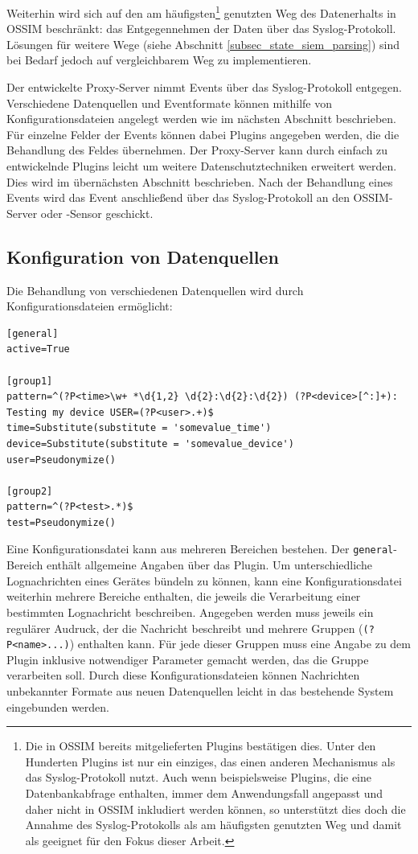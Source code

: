 Weiterhin wird sich auf den am häufigsten\footnote{
  Die in OSSIM bereits mitgelieferten Plugins bestätigen dies. Unter den Hunderten Plugins ist nur ein einziges, das einen anderen Mechanismus als das Syslog-Protokoll nutzt. Auch wenn beispielsweise Plugins, die eine Datenbankabfrage enthalten, immer dem Anwendungsfall angepasst und daher nicht in OSSIM inkludiert werden können, so unterstützt dies doch die Annahme des Syslog-Protokolls als am häufigsten genutzten Weg und damit als geeignet für den Fokus dieser Arbeit.
} genutzten Weg des Datenerhalts in OSSIM beschränkt: das Entgegennehmen der Daten über das Syslog-Protokoll. Lösungen für weitere Wege (siehe Abschnitt \ref{subsec_state_siem_parsing}) sind bei Bedarf jedoch auf vergleichbarem Weg zu implementieren.

Der entwickelte Proxy-Server nimmt Events über das Syslog-Protokoll entgegen. Verschiedene Datenquellen und Eventformate können mithilfe von Konfigurationsdateien angelegt werden wie im nächsten Abschnitt beschrieben. Für einzelne Felder der Events können dabei Plugins angegeben werden, die die Behandlung des Feldes übernehmen. Der Proxy-Server kann durch einfach zu entwickelnde Plugins leicht um weitere Datenschutztechniken erweitert werden. Dies wird im übernächsten Abschnitt beschrieben. Nach der Behandlung eines Events wird das Event anschließend über das Syslog-Protokoll an den OSSIM-Server oder -Sensor geschickt.

\subsection{Konfiguration von Datenquellen}

Die Behandlung von verschiedenen Datenquellen wird durch Konfigurationsdateien ermöglicht:

\begin{lstlisting}[morekeywords={general,active,pattern,group1,group2}]
[general]
active=True

[group1]
pattern=^(?P<time>\w+ *\d{1,2} \d{2}:\d{2}:\d{2}) (?P<device>[^:]+): Testing my device USER=(?P<user>.+)$
time=Substitute(substitute = 'somevalue_time')
device=Substitute(substitute = 'somevalue_device')
user=Pseudonymize()

[group2]
pattern=^(?P<test>.*)$
test=Pseudonymize()
\end{lstlisting}

Eine Konfigurationsdatei kann aus mehreren Bereichen bestehen. Der \texttt{general}-Bereich enthält allgemeine Angaben über das Plugin. Um unterschiedliche Lognachrichten eines Gerätes bündeln zu können, kann eine Konfigurationsdatei weiterhin mehrere Bereiche enthalten, die jeweils die Verarbeitung einer bestimmten Lognachricht beschreiben. Angegeben werden muss jeweils ein regulärer Audruck, der die Nachricht beschreibt und mehrere Gruppen (\texttt{(?P<name>...)}) enthalten kann. Für jede dieser Gruppen muss eine Angabe zu dem Plugin inklusive notwendiger Parameter gemacht werden, das die Gruppe verarbeiten soll. Durch diese Konfigurationsdateien können Nachrichten unbekannter Formate aus neuen Datenquellen leicht in das bestehende System eingebunden werden.

